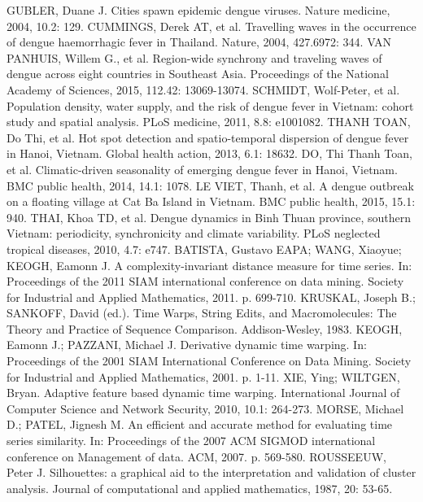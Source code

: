 \documentclass[a4paper,11pt,oneside]{book}
\begin{document}
\begin{thebibliography}{00}
GUBLER, Duane J. Cities spawn epidemic dengue viruses. Nature medicine, 2004, 10.2: 129.
CUMMINGS, Derek AT, et al. Travelling waves in the occurrence of dengue haemorrhagic fever in Thailand. Nature, 2004, 427.6972: 344.
VAN PANHUIS, Willem G., et al. Region-wide synchrony and traveling waves of dengue across eight countries in Southeast Asia. Proceedings of the National Academy of Sciences, 2015, 112.42: 13069-13074.
SCHMIDT, Wolf-Peter, et al. Population density, water supply, and the risk of dengue fever in Vietnam: cohort study and spatial analysis. PLoS medicine, 2011, 8.8: e1001082.
THANH TOAN, Do Thi, et al. Hot spot detection and spatio-temporal dispersion of dengue fever in Hanoi, Vietnam. Global health action, 2013, 6.1: 18632.
DO, Thi Thanh Toan, et al. Climatic-driven seasonality of emerging dengue fever in Hanoi, Vietnam. BMC public health, 2014, 14.1: 1078.
LE VIET, Thanh, et al. A dengue outbreak on a floating village at Cat Ba Island in Vietnam. BMC public health, 2015, 15.1: 940.
THAI, Khoa TD, et al. Dengue dynamics in Binh Thuan province, southern Vietnam: periodicity, synchronicity and climate variability. PLoS neglected tropical diseases, 2010, 4.7: e747.
BATISTA, Gustavo EAPA; WANG, Xiaoyue; KEOGH, Eamonn J. A complexity-invariant distance measure for time series. In: Proceedings of the 2011 SIAM international conference on data mining. Society for Industrial and Applied Mathematics, 2011. p. 699-710.
KRUSKAL, Joseph B.; SANKOFF, David (ed.). Time Warps, String Edits, and Macromolecules: The Theory and Practice of Sequence Comparison. Addison-Wesley, 1983.
KEOGH, Eamonn J.; PAZZANI, Michael J. Derivative dynamic time warping. In: Proceedings of the 2001 SIAM International Conference on Data Mining. Society for Industrial and Applied Mathematics, 2001. p. 1-11.
XIE, Ying; WILTGEN, Bryan. Adaptive feature based dynamic time warping. International Journal of Computer Science and Network Security, 2010, 10.1: 264-273.
MORSE, Michael D.; PATEL, Jignesh M. An efficient and accurate method for evaluating time series similarity. In: Proceedings of the 2007 ACM SIGMOD international conference on Management of data. ACM, 2007. p. 569-580.
ROUSSEEUW, Peter J. Silhouettes: a graphical aid to the interpretation and validation of cluster analysis. Journal of computational and applied mathematics, 1987, 20: 53-65.

\end{thebibliography}
\end{document}
